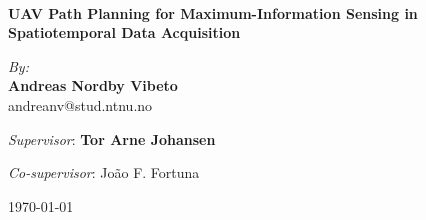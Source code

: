 
\begin{center}
\HRule \\[0.4cm]
{ \huge \bfseries UAV Path Planning for Maximum-Information Sensing in Spatiotemporal Data Acquisition}
\HRule \\[1.5cm]

\begin{center} \large
\emph{By:}\\
\textbf{Andreas Nordby Vibeto}\\
andreanv@stud.ntnu.no
\end{center}

\begin{center}\large
\emph{Supervisor}: \textbf{Tor Arne Johansen}
\end{center}
\begin{center}
\emph{Co-supervisor}: João F. Fortuna
\end{center}

\vfill

\begin{figure}[!h]
    \centering
\end{figure}

\vfill

{\large \monthyear\today}

\end{center}
\newpage